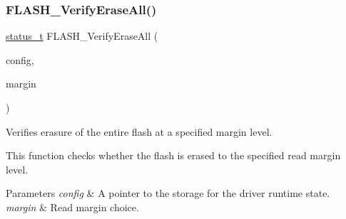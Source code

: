 \subsubsection{\texorpdfstring{FLASH\_VerifyEraseAll()}{FLASH\_VerifyEraseAll()}}
{\footnotesize\ttfamily \mbox{\hyperlink{group__ksdk__common_gaaabdaf7ee58ca7269bd4bf24efcde092}{status\+\_\+t}} F\+L\+A\+S\+H\+\_\+\+Verify\+Erase\+All (\begin{DoxyParamCaption}\item[{\mbox{\hyperlink{group__ftfx__flash__driver_ga0dfc969e6f9e17c17e60d823565141a5}{flash\+\_\+config\+\_\+t}} $\ast$}]{config,  }\item[{\mbox{\hyperlink{group__ftfx__controller_ga2cef5154a854c303445b4bd5139f6392}{ftfx\+\_\+margin\+\_\+value\+\_\+t}}}]{margin }\end{DoxyParamCaption})}



Verifies erasure of the entire flash at a specified margin level. 

This function checks whether the flash is erased to the specified read margin level.


\begin{DoxyParams}{Parameters}
{\em config} & A pointer to the storage for the driver runtime state. \\
\hline
{\em margin} & Read margin choice.\\
\hline
\end{DoxyParams}

